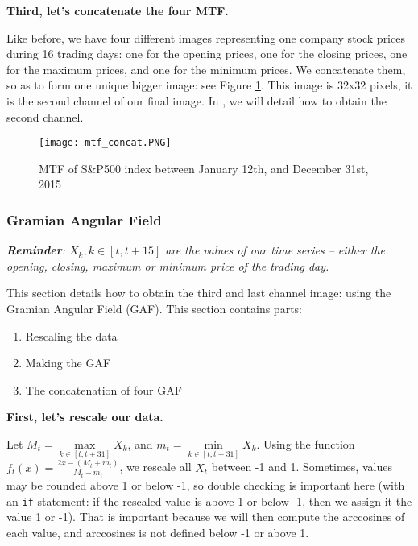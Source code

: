\documentclass[11pt]{article}
\newcommand{\code}[1]{\colorbox{light-gray}{\texttt{#1}}}
\begin{document}
\begin{onehalfspace}
\noindent \textbf{Third, let's concatenate the four MTF.}

Like before, we have four different images representing one company stock prices during 16 trading days: one for the opening prices, one for the closing prices, one for the maximum prices, and one for the minimum prices. We concatenate them, so as to form one unique bigger image: see Figure \ref{fig:mtf_concat}. This image is 32x32 pixels, it is the second channel of our final image. In , we will detail how to obtain the second channel.

\begin{figure}[h!]
    \centering
    \captionsetup{justification=centering}
    \texttt{[image: mtf\_concat.PNG]}
    \caption{MTF of S\&P500 index between January 12th, and December 31st, 2015}
\label{fig:mtf_concat}
\end{figure}

\subsubsection{Gramian Angular Field}
\label{sec:gaf}

\textit{\textbf{Reminder}: $X_k, k \in [t, t+15]$ are the values of our time series -- either the opening, closing, maximum or minimum price of the trading day.}

This section details how to obtain the third and last channel image: using the Gramian Angular Field (GAF). This section contains parts:

\begin{enumerate}
    \item Rescaling the data
    \item Making the GAF
    \item The concatenation of four GAF
\end{enumerate}

\noindent \textbf{First, let's rescale our data.}

Let $M_t = \max\limits_{k \in [t;t+31]} X_k$, and $m_t = \min\limits_{k \in [t;t+31]} X_k$. Using the function $f_t(x) = \frac{2 x - (M_t + m_t)}{M_t - m_t}$, we rescale all $X_t$ between -1 and 1. Sometimes, values may be rounded above 1 or below -1, so double checking is important here (with an \code{if} statement: if the rescaled value is above 1 or below -1, then we assign it the value 1 or -1). That is important because we will then compute the arccosines of each value, and arccosines is not defined below -1 or above 1.


\end{onehalfspace}
\end{document}
